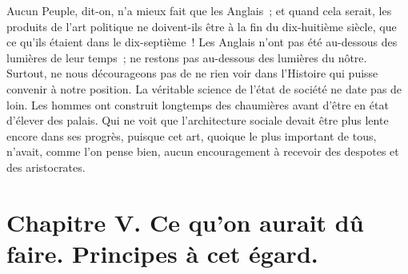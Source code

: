 \documentclass[french,twoside]{book} %
\newcommand\chapteropen{} %
\newcommand\chapterclose{} %
\begin{document}
Aucun Peuple, dit-on, n’a mieux fait que les Anglais ; et quand cela serait, les produits de l’art politique ne doivent-ils être à la fin du dix-huitième siècle, que ce qu’ils étaient dans le dix-septième ! Les Anglais n’ont pas été au-dessous des lumières de leur temps ; ne restons pas au-dessous des lumières du nôtre. Surtout, ne nous décourageons pas de ne rien voir dans l’Histoire qui puisse convenir à notre position. La véritable science de l’état de société ne date pas de loin. Les hommes ont construit longtemps des chaumières avant d’être en état d’élever des palais. Qui ne voit que l’architecture sociale devait être plus lente encore dans ses progrès, puisque cet art, quoique le plus important de tous, n’avait, comme l’on pense bien, aucun encouragement à recevoir des despotes et des aristocrates.\par

\chapterclose


\chapteropen
\chapter[{Chapitre V. Ce qu’on aurait dû faire. Principes à cet égard.}]{Chapitre V. Ce qu’on aurait dû faire. Principes à cet égard.}\renewcommand{\leftmark}{Chapitre V. Ce qu’on aurait dû faire. Principes à cet égard.}
\end{document}
